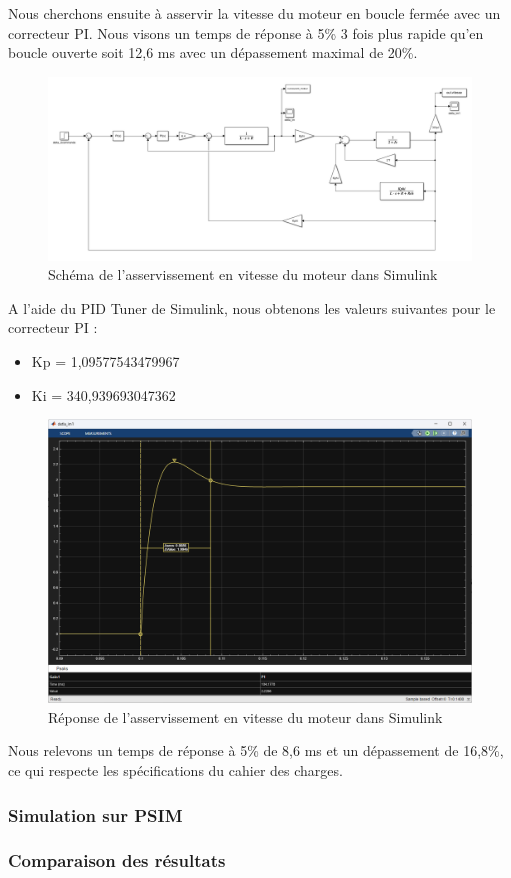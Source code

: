 Nous cherchons ensuite à asservir la vitesse du moteur en boucle fermée avec un correcteur PI. Nous visons un temps de réponse à 5\% 3 fois plus rapide qu'en boucle ouverte soit 12,6 ms avec un dépassement maximal de 20\%.
\begin{figure}[H]
    \centering
    \includegraphics[width=1\textwidth]{images/asserv_de_vitesse_tachy/Simulink_boucle_de_courant_vitesse.png}
    \caption{Schéma de l'asservissement en vitesse du moteur dans Simulink}
    \label{fig:asservissement_vitesse_simulink_schema}
\end{figure}
A l'aide du PID Tuner de Simulink, nous obtenons les valeurs suivantes pour le correcteur PI :
\begin{itemize}
    \item Kp = 1,09577543479967
    \item Ki = 340,939693047362
\end{itemize}
\begin{figure}[H]
    \centering
    \includegraphics[width=1\textwidth]{images/asserv_de_vitesse_tachy/Vitesse_tr5_BF.png}
    \caption{Réponse de l'asservissement en vitesse du moteur dans Simulink}
    \label{fig:reponse_asservissement_vitesse_simulink}
\end{figure}
Nous relevons un temps de réponse à 5\% de 8,6 ms et un dépassement de 16,8\%, ce qui respecte les spécifications du cahier des charges.

\subsubsection{Simulation sur PSIM}

\subsubsection{Comparaison des résultats}

